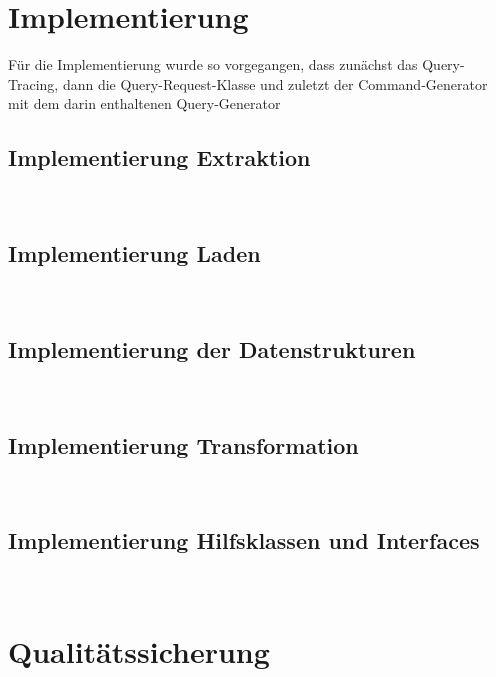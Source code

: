 \documentclass[11pt,toc=sectionentrywithoutdots, 
headheight=44pt, headings=optiontoheadandtoc, hyperfootnotes=false, hypertexnames=false]{scrartcl}
\begin{document}



\section{Implementierung}
Für die Implementierung wurde so vorgegangen, dass zunächst das Query-Tracing, dann die Query-Request-Klasse und zuletzt der Command-Generator mit dem darin enthaltenen Query-Generator

\subsection{Implementierung Extraktion}
\blindtext\

\subsection{Implementierung Laden}
\blindtext\

\subsection{Implementierung der Datenstrukturen}
\blindtext\

\subsection{Implementierung Transformation}
\blindtext\

\subsection{Implementierung Hilfsklassen und Interfaces}
\blindtext\

\section{Qualitätssicherung}
\blindtext\
\end{document}
